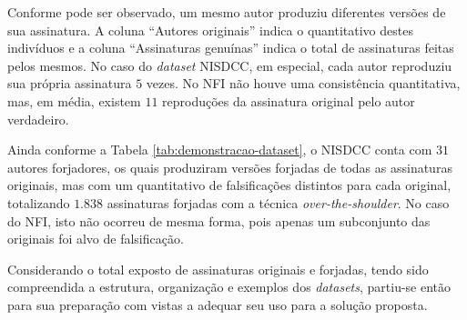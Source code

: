Conforme pode ser observado, um mesmo autor produziu diferentes versões de sua assinatura. A coluna ``Autores originais'' indica o quantitativo destes indivíduos e a coluna ``Assinaturas genuínas'' indica o total de assinaturas feitas pelos mesmos. No caso do \emph{dataset} NISDCC, em especial, cada autor reproduziu sua própria assinatura $5$ vezes. No NFI não houve uma consistência quantitativa, mas, em média, existem $11$ reproduções da assinatura original pelo autor verdadeiro.

Ainda conforme a Tabela \ref{tab:demonstracao-dataset}, o NISDCC conta com $31$ autores forjadores, os quais produziram versões forjadas de todas as assinaturas originais, mas com um quantitativo de falsificações distintos para cada original, totalizando $1.838$ assinaturas forjadas com a técnica \emph{over-the-shoulder}. No caso do NFI, isto não ocorreu de mesma forma, pois apenas um subconjunto das originais foi alvo de falsificação.

Considerando o total exposto de assinaturas originais e forjadas, tendo sido compreendida a estrutura, organização e exemplos dos \emph{datasets}, partiu-se então para sua preparação com vistas a adequar seu uso para a solução proposta.
